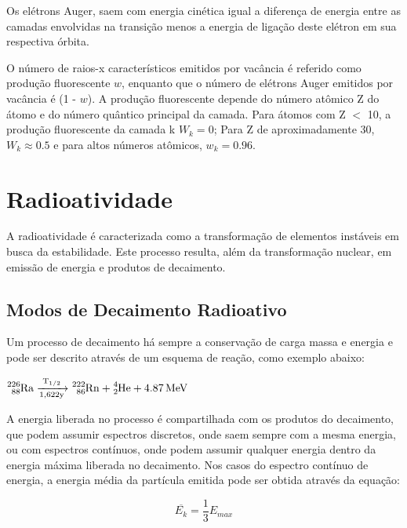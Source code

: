 \documentclass[11pt,a4paper]{article}
\newcounter{exemplo}
\begin{document}
                Os elétrons Auger, saem com energia cinética igual a diferença de energia entre as camadas envolvidas na transição menos a energia de ligação deste elétron em sua respectiva órbita.


                O número de raios-x característicos emitidos por vacância é referido como produção fluorescente $w$, enquanto que o número de elétrons Auger emitidos por vacância é (1 - $w$). A produção fluorescente depende do número atômico Z do átomo e do número quântico principal da camada. Para átomos com Z $<$ 10, a produção fluorescente da camada k $W_k = 0$; Para Z de aproximadamente 30, $W_k \approx 0.5$ e para altos números atômicos, $w_k = 0.96$.


    \section{Radioatividade}

        A radioatividade é caracterizada como a transformação de elementos instáveis em busca da estabilidade. Este processo resulta, além da transformação nuclear, em emissão de energia e produtos de decaimento.
        
        
        \subsection{Modos de Decaimento Radioativo}

            Um processo de decaimento há sempre a conservação de carga massa e energia e pode ser descrito através de um esquema de reação, como exemplo abaixo:

            \begin{center}
                $\ce{^{226}_{88}Ra ->[{T_{1/2}}][{1,622y}] ^{222}_{86}Rn + ^{4}_{2}He + 4.87 MeV}$
            \end{center}

            A energia liberada no processo é compartilhada com os produtos do decaimento, que podem assumir espectros discretos, onde saem sempre com a mesma energia, ou com espectros contínuos, onde podem assumir qualquer energia dentro da energia máxima liberada no decaimento. Nos casos do espectro contínuo de energia, a energia média da partícula emitida pode ser obtida através da equação:
            
                \begin{equation}
                    \overline{E_k} = \frac{1}{3} E_{max}
                \end{equation}
            
\end{document}
